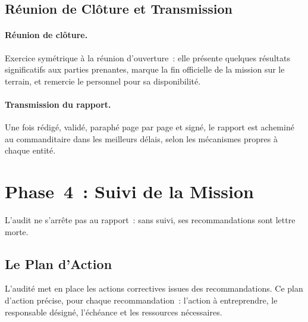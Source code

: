 \subsection{Réunion de Clôture et Transmission}
\label{subsec:cloture}

\paragraph{Réunion de clôture.}
Exercice symétrique à la réunion d'ouverture~: elle présente quelques résultats
significatifs aux parties prenantes, marque la fin officielle de la mission sur le
terrain, et remercie le personnel pour sa disponibilité.

\paragraph{Transmission du rapport.}
Une fois rédigé, validé, paraphé page par page et signé, le rapport est acheminé au
commanditaire dans les meilleurs délais, selon les mécanismes propres à chaque entité.

\section{Phase~4~: Suivi de la Mission}
\label{sec:suivi}

L'audit ne s'arrête pas au rapport~: sans suivi, ses recommandations sont lettre morte.

\subsection{Le Plan d'Action}
\label{subsec:plan-action}

L'audité met en place les actions correctives issues des recommandations. Ce plan
d'action précise, pour chaque recommandation~: l'action à entreprendre, le responsable
désigné, l'échéance et les ressources nécessaires.

